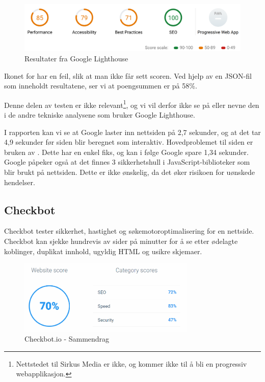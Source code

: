 \begin{figure}[H]
    \centering
    \includegraphics[width=\textwidth]{bjornar/Lighthouse-Report-mobile.png}
    \caption{Resultater fra Google Lighthouse}
    \label{fig:analysis-current-lightouse-summary}
\end{figure}

Ikonet for  har en feil, slik at man ikke får sett scoren. Ved hjelp av en JSON-fil som inneholdt resultatene, ser vi at poengsummen er på 58\%.

Denne delen av testen er ikke relevant\footnote{Nettstedet til Sirkus Media er ikke, og kommer ikke til å bli en progressiv webapplikasjon.}, og vi vil derfor ikke se på eller nevne den i de andre tekniske analysene som bruker Google Lighthouse.

I rapporten kan vi se at Google laster inn nettsiden på 2,7 sekunder, og at det tar 4,9 sekunder før siden blir beregnet som interaktiv. Hovedproblemet til siden er bruken av . Dette har en enkel fiks, og kan i følge Google spare 1,34 sekunder. Google påpeker også at det finnes 3 sikkerhetshull i JavaScript-biblioteker som blir brukt på nettsiden. Dette er ikke ønskelig, da det øker risikoen for uønskede hendelser.

\subsection{Checkbot}
Checkbot \cite{checkbot2019cth} tester sikkerhet, hastighet og søkemotoroptimalisering for en nettside. Checkbot kan sjekke hundrevis av sider på minutter for å se etter ødelagte koblinger, duplikat innhold, ugyldig HTML og usikre skjemaer.

\begin{figure}[H]
    \centering
    \includegraphics[width=0.75\textwidth]{bjornar/checkbotio-summary.png}
    \caption{Checkbot.io - Sammendrag}
    \label{fig:analysis-current-checkbot-summary}
\end{figure}

